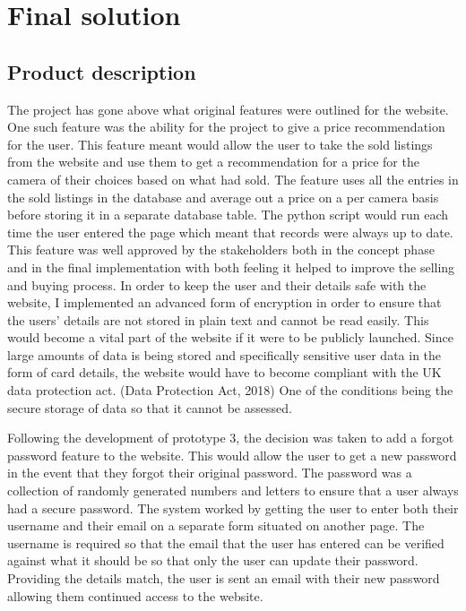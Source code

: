 \section{Final solution}
\subsection{Product description}
The project has gone above what original features were outlined for the website. One such feature was the ability for the project to give a price recommendation for the user. This feature meant would allow the user to take the sold listings from the website and use them to get a recommendation for a price for the camera of their choices based on what had sold. The feature uses all the entries in the sold listings in the database and average out a price on a per camera basis before storing it in a separate database table. The python script would run each time the user entered the page which meant that records were always up to date. This feature was well approved by the stakeholders both in the concept phase and in the final implementation with both feeling it helped to improve the selling and buying process.
In order to keep the user and their details safe with the website, I implemented an advanced form of encryption in order to ensure that the users’ details are not stored in plain text and cannot be read easily. This would become a vital part of the website if it were to be publicly launched. Since large amounts of data is being stored and specifically sensitive user data in the form of card details, the website would have to become compliant with the UK data protection act. (Data Protection Act, 2018) One of the conditions being the secure storage of data so that it cannot be assessed.

Following the development of prototype 3, the decision was taken to add a forgot password feature to the website. This would allow the user to get a new password in the event that they forgot their original password. The password was a collection of randomly generated numbers and letters to ensure that a user always had a secure password. The system worked by getting the user to enter both their username and their email on a separate form situated on another page. The username is required so that the email that the user has entered can be verified against what it should be so that only the user can update their password. Providing the details match, the user is sent an email with their new password allowing them continued access to the website. 
